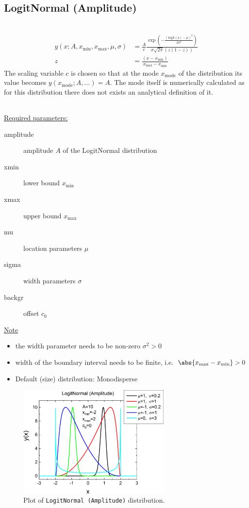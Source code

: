 \subsection{LogitNormal (Amplitude)} ~\\
\label{sec:LogitAmplitude}
\begin{align}
y(x; A,x_\mathrm{min},x_\mathrm{max},\mu,\sigma) &= \frac{A}{c} \frac{\exp\left(-\frac{\left(\operatorname{logit(z)}-\mu\right)^2}{2\sigma^2}\right)} {\sigma\sqrt{2\pi}\left(z(1-z)\right)} \\
z &= \frac{\left(x-x_\mathrm{min}\right)}{x_\mathrm{max}-x_\mathrm{min}}
\end{align}
The scaling variable $c$ is chosen so that at the mode $x_\mathrm{mode}$ of the distribution its value becomes $y(x_\mathrm{mode}; A,\ldots) = A$. The mode itself is numerically calculated as for this distribution there does not exists an analytical definition of it.

 ~\\

\underline{Required parameters:}
\begin{description}
    \item[amplitude] amplitude $A$ of the LogitNormal distribution
    \item[xmin] lower bound $x_\mathrm{min}$
    \item[xmax] upper bound $x_\mathrm{max}$
    \item[mu] location parameters $\mu$
    \item[sigma] width parameters $\sigma$
    \item[backgr] offset $c_0$
\end{description}

\underline{Note}
\begin{itemize}
  \item the width parameter needs to be non-zero $\sigma^2 > 0$
  \item width of the boundary interval needs to be finite, i.e.\ $\abs{x_\mathrm{max}-x_\mathrm{min}}>0$
  \item Default (size) distribution: Monodisperse
\end{itemize}

\begin{figure}[htb]
\begin{center}
\includegraphics[width=0.6824\textwidth]{../images/peaks/LogitNormal/LogitAmplitude.png}
\end{center}
\caption{Plot of \texttt{LogitNormal (Amplitude)} distribution.}
\label{fig:LogitAmplitude}
\end{figure}

